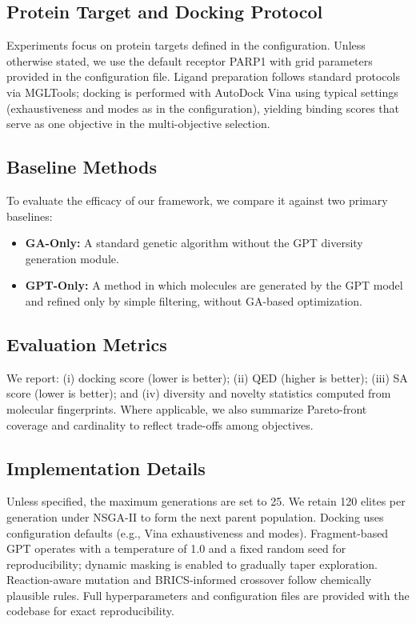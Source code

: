 \documentclass[lettersize,journal]{IEEEtran}
\begin{document}
\subsection{Protein Target and Docking Protocol}
Experiments focus on protein targets defined in the configuration. Unless otherwise stated, we use the default receptor PARP1 with grid parameters provided in the configuration file. Ligand preparation follows standard protocols via MGLTools; docking is performed with AutoDock Vina using typical settings (exhaustiveness and modes as in the configuration), yielding binding scores that serve as one objective in the multi-objective selection.
\subsection{Baseline Methods}
To evaluate the efficacy of our framework, we compare it against two primary baselines:
\begin{itemize}
    \item \textbf{GA-Only:} A standard genetic algorithm without the GPT diversity generation module.
    \item \textbf{GPT-Only:} A method in which molecules are generated by the GPT model and refined only by simple filtering, without GA-based optimization.
\end{itemize}
\subsection{Evaluation Metrics}
We report: (i) docking score (lower is better); (ii) QED (higher is better); (iii) SA score (lower is better); and (iv) diversity and novelty statistics computed from molecular fingerprints. Where applicable, we also summarize Pareto-front coverage and cardinality to reflect trade-offs among objectives.
\subsection{Implementation Details}
Unless specified, the maximum generations are set to 25. We retain 120 elites per generation under NSGA-II to form the next parent population. Docking uses configuration defaults (e.g., Vina exhaustiveness and modes). Fragment-based GPT operates with a temperature of 1.0 and a fixed random seed for reproducibility; dynamic masking is enabled to gradually taper exploration. Reaction-aware mutation and BRICS-informed crossover follow chemically plausible rules. Full hyperparameters and configuration files are provided with the codebase for exact reproducibility.
\end{document}
